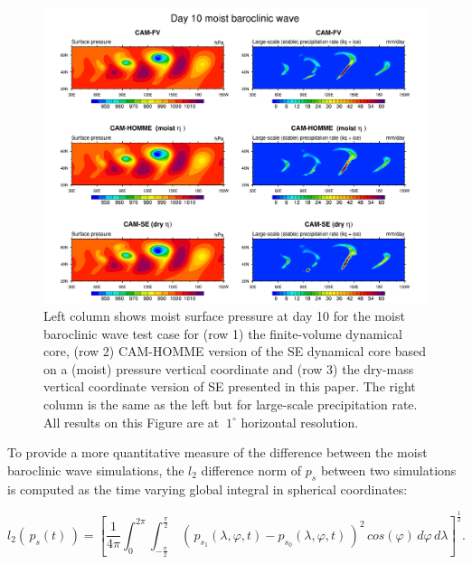 \documentclass{agujournal}
\begin{document}
{\begin{figure}[h]
\centering
\includegraphics[width=33pc]{figs/02_baro_wave.pdf}
\caption{Left column shows moist surface pressure at day 10 for the moist baroclinic wave test case for (row 1) the finite-volume dynamical core, (row 2) CAM-HOMME version of the SE dynamical core based on a (moist) pressure vertical coordinate and (row 3) the dry-mass vertical coordinate version of SE presented in this paper. The right column is the same as the left but for large-scale precipitation rate. All results on this Figure are at $~1^\circ$ horizontal resolution.}
\label{fig:baro_wave}
\end{figure}

To provide a more quantitative measure of the difference between the moist baroclinic wave simulations, the $l_2$ difference norm of $p_s$ between two simulations is computed as the time varying global integral in spherical coordinates:

\begin{equation}
l_2\left(\,p_s(t)\,\right) = \left[ \frac{1}{4\pi}\int^{2\pi}_{0} \int^{\frac{\pi}{2}}_{-\frac{\pi}{2}} \ \left(\,p_{s_1}(\lambda,\varphi,t) - p_{s_0}(\lambda,\varphi,t)\,\right)^2 \, cos(\varphi) \, d\varphi \, d\lambda \right]^\frac{1}{2}.
\end{equation}

}
\end{document}
